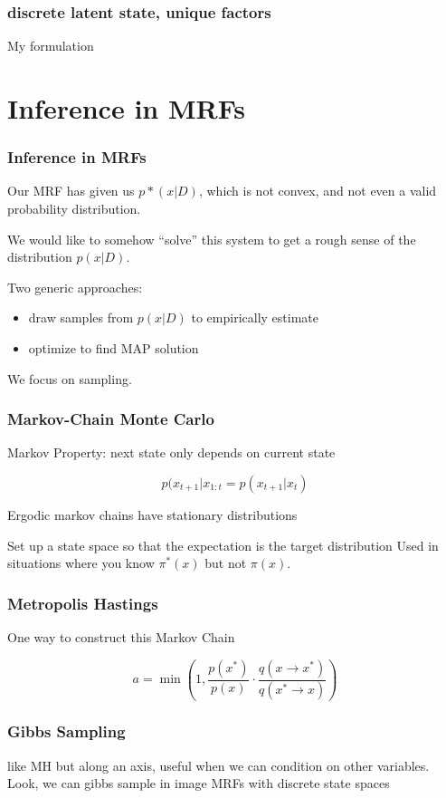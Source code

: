 \documentclass{beamer}
\begin{document}
\begin{frame}
\frametitle{discrete latent state, unique factors}
My formulation
\end{frame} 

\section{Inference in MRFs}

\begin{frame}
\frametitle{Inference in MRFs}
Our MRF has given us $p*(x | D)$, which is not convex, 
and not even a valid probability distribution. 

We would like to somehow ``solve'' this system to get a rough
sense of the distribution $p(x |D)$. 

Two generic approaches: 
\begin{itemize}
\item draw samples from $p(x | D)$ to empirically estimate 
\item optimize to find MAP solution
\end{itemize}
\pause

We focus on sampling. 
\end{frame}

\begin{frame}
  \frametitle{Markov-Chain Monte Carlo}
  Markov Property: next state only depends on current state

  \begin{equation}
    p(x_{t+1} | x_{1:t} = p(x_{t+1} | x_{t})
  \end{equation}

  Ergodic markov chains have stationary distributions
  
  Set up a state space so that the expectation is the target distribution
  Used in situations where you know $\pi^\ast(x)$ but not $\pi(x)$. 
\end{frame}

\begin{frame}
  \frametitle{Metropolis Hastings}
  One way to construct this Markov Chain
  
  \begin{equation}
    a = \min (1, \frac{p(x^\ast)}{p(x)} \cdot 
  \frac{q(x \rightarrow x^\ast)}{q(x^\ast \rightarrow x)})
  \end{equation}

  \cite{Metropolis1953}
\end{frame}

\begin{frame}
  \frametitle{Gibbs Sampling}
  like MH but along an axis, useful when we can condition
  on other variables. 
  Look, we can gibbs sample in image MRFs with discrete state spaces
  \cite{GemanGeman1983}
\end{frame}
\end{document}
